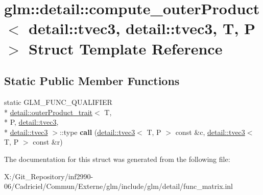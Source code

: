 \hypertarget{structglm_1_1detail_1_1compute__outer_product_3_01detail_1_1tvec3_00_01detail_1_1tvec3_00_01_t_00_01_p_01_4}{\section{glm\-:\-:detail\-:\-:compute\-\_\-outer\-Product$<$ detail\-:\-:tvec3, detail\-:\-:tvec3, T, P $>$ Struct Template Reference}
\label{structglm_1_1detail_1_1compute__outer_product_3_01detail_1_1tvec3_00_01detail_1_1tvec3_00_01_t_00_01_p_01_4}
}
\subsection*{Static Public Member Functions}
\begin{DoxyCompactItemize}
\item 
\hypertarget{structglm_1_1detail_1_1compute__outer_product_3_01detail_1_1tvec3_00_01detail_1_1tvec3_00_01_t_00_01_p_01_4_ab97eae3a1827791b1e9e3324ea454b2d}{static G\-L\-M\-\_\-\-F\-U\-N\-C\-\_\-\-Q\-U\-A\-L\-I\-F\-I\-E\-R \\*
\hyperlink{structglm_1_1detail_1_1outer_product__trait}{detail\-::outer\-Product\-\_\-trait}$<$ T, \\*
P, \hyperlink{structglm_1_1detail_1_1tvec3}{detail\-::tvec3}, \\*
\hyperlink{structglm_1_1detail_1_1tvec3}{detail\-::tvec3} $>$\-::type {\bfseries call} (\hyperlink{structglm_1_1detail_1_1tvec3}{detail\-::tvec3}$<$ T, P $>$ const \&c, \hyperlink{structglm_1_1detail_1_1tvec3}{detail\-::tvec3}$<$ T, P $>$ const \&r)}\label{structglm_1_1detail_1_1compute__outer_product_3_01detail_1_1tvec3_00_01detail_1_1tvec3_00_01_t_00_01_p_01_4_ab97eae3a1827791b1e9e3324ea454b2d}

\end{DoxyCompactItemize}


The documentation for this struct was generated from the following file\-:\begin{DoxyCompactItemize}
\item 
X\-:/\-Git\-\_\-\-Repository/inf2990-\/06/\-Cadriciel/\-Commun/\-Externe/glm/include/glm/detail/func\-\_\-matrix.\-inl\end{DoxyCompactItemize}
